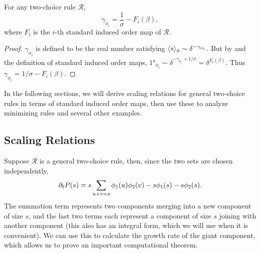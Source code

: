 \documentclass[twoside,10pt]{article}
\begin{document}
\begin{prop}
	\label{exponent-to-induced-map}
	For any two-choice rule $\mathcal{R}$,
	\[
		\gamma_{\phi_{i}} = \frac{1}{\sigma} - F_{i}(\beta),
	\] where $F_{i}$ is the $i$-th standard induced order map of $\mathcal{R}$.
\end{prop}
\begin{proof}
	$\gamma_{\phi_i}$ is defined to be the real number satisfying $\langle s \rangle_{\phi} \sim \delta^{-\gamma_{\phi_i}}$. But by  and the definition of standard induced order maps, $\ang{1}_{\phi_{i}} \sim \delta^{-\gamma_{\phi_i}+1/\sigma} = \delta^{F_{i}(\beta)}$. Thus $\gamma_{\phi_i} = 1/\sigma - F_{i}(\beta)$.
\end{proof}

In the following sections, we will derive scaling relations for general two-choice rules in terms of standard induced order maps, then use these to analyze minimizing rules and several other examples.


\subsection{Scaling Relations}

Suppose $\mathcal{R}$ is a general two-choice rule, then, since the two sets are chosen independently,
	\begin{equation}
		\label{smoluchowski}
                \partial_{t}{P(s)} = s \sum_{u+v=s} \phi_1(u) \phi_2(v) - s \phi_1(s) - s\phi_2(s).
	\end{equation}
	The summation term represents two components merging into a new component of size $s$, and the last two terms each represent a component of size $s$ joining with another component (this also has an integral form, which we will use when it is convenient). We can use this to calculate the growth rate of the giant component, which allows us to prove an important computational theorem.
\end{document}
